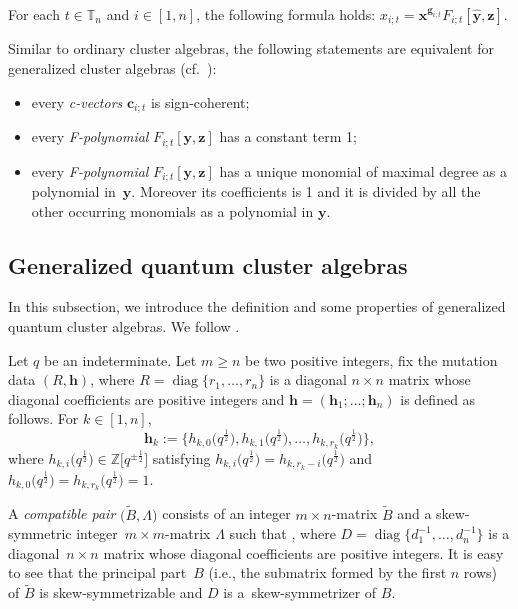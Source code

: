 \begin{Proposition}\label{p:separation-formula-gca}
 For each $t\in \mathbb{T}_n$ and $i\in[1,n]$, the following formula holds:
 $
 x_{i;t}=\mathbf{x}^{\mathbf{g}_{i;t}}F_{i;t}[\hat{\mathbf{y}},\mathbf{z}]$.
\end{Proposition}
\begin{Remark}
 Similar to ordinary cluster algebras, the following statements are equivalent for generalized cluster algebras (cf.\ \cite[Proposition 3.19]{Nakanishi14}):
 \begin{itemize}\itemsep=0pt
 \item every {\it c-vectors} $\mathbf{c}_{i;t}$ is sign-coherent;
 \item every {\it F-polynomial} $F_{i;t}[\mathbf{y},\mathbf{z}]$ has a constant term 1;
 \item every {\it F-polynomial} $F_{i;t}[\mathbf{y},\mathbf{z}]$ has a unique monomial of maximal degree as a polynomial in~$\mathbf{y}$. Moreover its coefficients is 1 and it is divided by all the other occurring monomials as a polynomial in $\mathbf{y}$.
\end{itemize}
\end{Remark}

\subsection{Generalized quantum cluster algebras}\label{ss:gqca}
In this subsection, we introduce the definition and some properties of generalized quantum cluster algebras. We follow \cite{BCDX2018}.

Let $q$ be an indeterminate. Let $m\ge n$ be two positive integers, fix the mutation data $(R,\mathbf{h})$, where $R=\operatorname{diag}\{r_1,\dots,r_n\}$ is a diagonal $n\times n$ matrix whose diagonal coefficients are positive integers and $\mathbf{h}=(\mathbf{h}_1;\dots;\mathbf{h}_n)$ is defined as follows.
For $k\in[1,n]$,
\[
\mathbf{h}_{k}:=\bigl\{h_{k,0}\bigl(q^{\frac{1}{2}}\bigr),h_{k,1}\bigl(q^{\frac{1}{2}}\bigr),\dots,h_{k,r_{k}}\bigl(q^{\frac{1}{2}}\bigr)\bigr\},
\]
where $h_{k,i}\bigl(q^{\frac{1}{2}}\bigr)\in\mathbb{Z}\big[q^{\pm\frac{1}{2}}\big]$ satisfying $h_{k,i}\bigl(q^{\frac{1}{2}}\bigr)=h_{k,r_{k}-i}\bigl(q^{\frac{1}{2}}\bigr)$
and $h_{k,0}\bigl(q^{\frac{1}{2}}\bigr)=h_{k,r_{k}}\bigl(q^{\frac{1}{2}}\bigr)=1$.

A {\it compatible pair} $\bigl(\tilde{B}, \Lambda\bigr)$ consists of an integer $m\times n$-matrix $\tilde{B}$ and a skew-symmetric integer~${m\times m}$-matrix $\Lambda$ such that
,
where $D=\operatorname{diag}\bigl\{d_1^{-1},\dots, d_n^{-1}\bigr\}$ is a diagonal~${n\times n}$ matrix whose diagonal coefficients are positive integers. It is easy to see that the principal part~$B$ (i.e., the submatrix formed by the first $n$ rows) of $\tilde{B}$ is skew-symmetrizable and $D$ is a~skew-symmetrizer of $B$.

